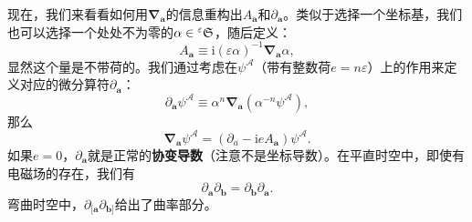 现在，我们来看看如何用$\boldsymbol{\nabla }_{\boldsymbol{a}}$的信息重构出$A_{\boldsymbol{a}}$和$\partial _{\boldsymbol{a}}$。类似于选择一个坐标基，我们也可以选择一个处处不为零的$\alpha \in \prescript{\varepsilon }{}{}\mathfrak{S}$，随后定义：
\begin{equation}
	A_{\boldsymbol{a}} \equiv \mathrm{i}( \varepsilon \alpha )^{-1}\boldsymbol{\nabla }_{\boldsymbol{a}} \alpha ,
	\label{eq:6.2}
\end{equation}
显然这个量是不带荷的。我们通过考虑在$\psi ^{\mathcal{A}}$（带有整数荷$e=n\varepsilon $）上的作用来定义对应的微分算符$\partial _{\boldsymbol{a}}$：
\begin{equation*}
	\partial _{\boldsymbol{a}} \psi ^{\mathcal{A}} \equiv \alpha ^{n}\boldsymbol{\nabla }_{\boldsymbol{a}} (\alpha ^{-n} \psi ^{\mathcal{A}} ),
\end{equation*}
那么
\begin{equation*}
	\boldsymbol{\nabla }_{\boldsymbol{a}} \psi ^{\mathcal{A}} =( \partial _{a} -\mathrm{i} eA_{\boldsymbol{a}}) \psi ^{\mathcal{A}} .
\end{equation*}
如果$e=0$，$\partial _{\boldsymbol{a}}$就是正常的\textbf{协变导数}（注意不是坐标导数）。在平直时空中，即使有电磁场的存在，我们有
\begin{equation*}
	\partial _{\boldsymbol{a}} \partial _{\boldsymbol{b}} =\partial _{\boldsymbol{b}} \partial _{\boldsymbol{a}} .
\end{equation*}
弯曲时空中，$\partial _{[\boldsymbol{a}} \partial _{\boldsymbol{b}]}$给出了曲率部分。



